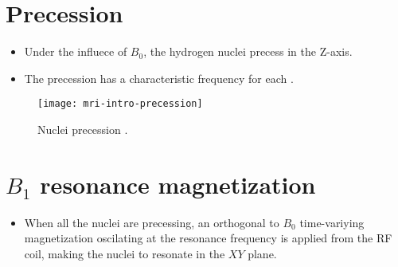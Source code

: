 \section{Precession}
\begin{itemize}
\item Under the influece of $B_0$, the hydrogen nuclei precess in the Z-axis.
\item The precession has a characteristic 
  frequency for each .
\end{itemize}
\vspace{-4ex}
\begin{figure}[!b]
  \centering
  \texttt{[image: mri-intro-precession]}
  \caption{Nuclei precession \cite{abdulla2025MRI_intro}.}
  \label{fig:MRI-intro-precession}
\end{figure}

\section{$B_1$ resonance magnetization}
\begin{itemize}
\item When all the nuclei are precessing, an orthogonal to $B_0$
  time-variying magnetization oscilating at the resonance frequency is
  applied from the RF coil, making the nuclei to resonate in the
  $XY$ plane.
\end{itemize}

